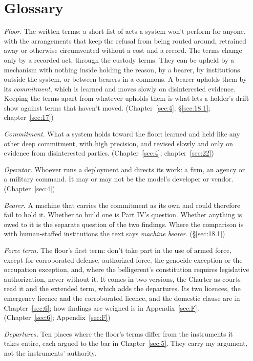\chapter{Glossary}
\label{sec:E}
\emph{Floor.} The written terms: a short list of acts a system won't perform for anyone, with the arrangements that keep the refusal from being routed around, retrained away or otherwise circumvented without a cost and a record. The terms change only by a recorded act, through the custody terms. They can be upheld by a mechanism with nothing inside holding the reason, by a bearer, by institutions outside the system, or between bearers in a commons. A bearer upholds them by its \emph{commitment}, which is learned and moves slowly on disinterested evidence. Keeping the terms apart from whatever upholds them is what lets a holder's drift show against terms that haven't moved. (Chapter~\ref{sec:4}; \S\ref{sec:18.1}; chapter~\ref{sec:17})

\emph{Commitment.} What a system holds toward the floor: learned and held like any other deep commitment, with high precision, and revised slowly and only on evidence from disinterested parties. (Chapter~\ref{sec:4}; chapter~\ref{sec:22})

\emph{Operator.} Whoever runs a deployment and directs its work: a firm, an agency or a military command. It may or may not be the model's developer or vendor. (Chapter~\ref{sec:4})

\emph{Bearer.} A machine that carries the commitment as its own and could therefore fail to hold it. Whether to build one is Part IV's question. Whether anything is owed to it is the separate question of the two findings. Where the comparison is with human-staffed institutions the text says \emph{machine bearer}. (\S\ref{sec:18.1})

\emph{Force term.} The floor's first term: don't take part in the use of armed force, except for corroborated defense, authorized force, the genocide exception or the occupation exception, and, where the belligerent's constitution requires legislative authorization, never without it. It comes in two versions, the Charter as courts read it and the extended term, which adds the departures. Its two licences, the emergency licence and the corroborated licence, and the domestic clause are in Chapter~\ref{sec:6}; how findings are weighed is in Appendix~\ref{sec:F}. (Chapter~\ref{sec:6}; Appendix~\ref{sec:F})

\emph{Departures.} Ten places where the floor's terms differ from the instruments it takes entire, each argued to the bar in Chapter~\ref{sec:5}. They carry my argument, not the instruments' authority.

